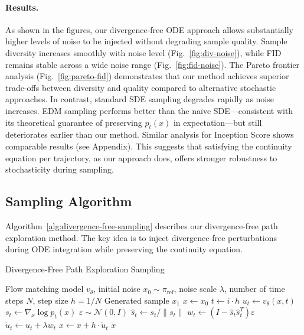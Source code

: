 \documentclass{article}
\begin{document}
\paragraph{Results.}
As shown in the figures, our divergence-free ODE approach allows substantially higher levels of noise to be injected without degrading sample quality. Sample diversity increases smoothly with noise level (Fig.~\ref{fig:div-noise}), while FID remains stable across a wide noise range (Fig.~\ref{fig:fid-noise}). The Pareto frontier analysis (Fig.~\ref{fig:pareto-fid}) demonstrates that our method achieves superior trade-offs between diversity and quality compared to alternative stochastic approaches. In contrast, standard SDE sampling degrades rapidly as noise increases. EDM sampling performs better than the naïve SDE—consistent with its theoretical guarantee of preserving \(p_t(x)\) in expectation—but still deteriorates earlier than our method. Similar analysis for Inception Score shows comparable results (see Appendix). This suggests that satisfying the continuity equation per trajectory, as our approach does, offers stronger robustness to stochasticity during sampling.

\subsection{Sampling Algorithm}
Algorithm~\ref{alg:divergence-free-sampling} describes our divergence-free path exploration method. The key idea is to inject divergence-free perturbations during ODE integration while preserving the continuity equation.

\begin{algorithm}[H]
\caption{Divergence-Free Path Exploration Sampling}
\label{alg:divergence-free-sampling}
\begin{algorithmic}[1]
\Require Flow matching model $v_\theta$, initial noise $x_0 \sim \pi_{\text{ref}}$, noise scale $\lambda$, number of time steps $N$, step size $h = 1/N$
\Ensure Generated sample $x_1$
\State $x \leftarrow x_0$
    \State $t \leftarrow i \cdot h$
    \State $u_t \leftarrow v_\theta(x, t)$ 
    \State $s_t \leftarrow \nabla_x \log p_t(x)$ 
    \State $\varepsilon \sim \mathcal{N}(0, I)$ 
    \State $\hat{s}_t \leftarrow s_t / \|s_t\|$ 
    \State $w_t \leftarrow (I - \hat{s}_t \hat{s}_t^T) \varepsilon$ 
    \State $\tilde{u}_t \leftarrow u_t + \lambda w_t$ 
    \State $x \leftarrow x + h \cdot \tilde{u}_t$ 
\EndFor
\State \Return $x$
\end{algorithmic}
\end{algorithm}
\end{document}
